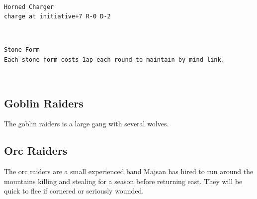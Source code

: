 \

\begin{samepage} \small \begin{verbatim}
Horned Charger
charge at initiative+7 R-0 D-2
\end{verbatim} \normalsize \end{samepage}

\

\begin{samepage} \small \begin{verbatim}
Stone Form
Each stone form costs 1ap each round to maintain by mind link.
\end{verbatim} \normalsize \end{samepage}

\






\subsection*{Goblin Raiders}
\label{sec:goblinstats}

The goblin raiders is a large gang with several wolves.







\subsection*{Orc Raiders}

The orc raiders are a small experienced band Majsan has hired to run around the mountains killing and stealing for a season before returning east. They will be quick to flee if cornered or seriously wounded.

